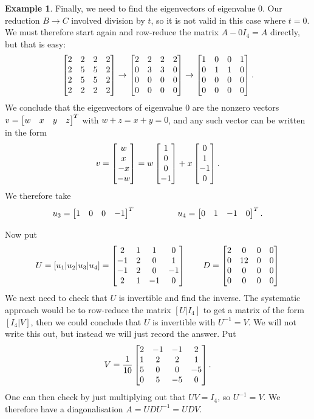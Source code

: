 \documentclass[reqno]{amsart}
\theoremstyle{definition}
\newtheorem{example}[theorem]{Example}
\begin{document}
\begin{example}
 Finally, we need to find the eigenvectors of eigenvalue $0$.  Our
 reduction $B\to C$ involved division by $t$, so it is not valid in
 this case where $t=0$.  We must therefore start again and row-reduce
 the matrix $A-0I_4=A$ directly, but that is easy:
 \[ \left[\begin{matrix} 2&2&2&2 \\ 2&5&5&2 \\ 2&5&5&2 \\ 2&2&2&2 \end{matrix}\right] \to 
    \left[\begin{matrix} 2&2&2&2 \\ 0&3&3&0 \\ 0&0&0&0 \\ 0&0&0&0 \end{matrix}\right] \to 
    \left[\begin{matrix} 1&0&0&1 \\ 0&1&1&0 \\ 0&0&0&0 \\ 0&0&0&0 \end{matrix}\right].  
 \]
 We conclude that the eigenvectors of eigenvalue $0$ are the nonzero vectors
 $v=\left[\begin{matrix} w&x&y&z\end{matrix}\right]^T$ with $w+z=x+y=0$, and any such vector can be
 written in the form
 \[ v = \left[\begin{matrix} w \\ x \\ -x \\ -w \end{matrix}\right] 
      = w \left[\begin{matrix} 1 \\ 0 \\ 0 \\ -1 \end{matrix}\right] + 
        x \left[\begin{matrix} 0 \\ 1 \\ -1 \\ 0 \end{matrix}\right].
 \]
 We therefore take 
 \[ u_3 = \left[\begin{matrix} 1&0&0&-1\end{matrix}\right]^T \hspace{5em}
    u_4 = \left[\begin{matrix} 0&1&-1&0\end{matrix}\right]^T .
 \]

 Now put 
 \[ U = [u_1|u_2|u_3|u_4] =
     \left[\begin{matrix} 
       2 & 1 &  1 &  0 \\
      -1 & 2 &  0 &  1 \\
      -1 & 2 &  0 & -1 \\
       2 & 1 & -1 &  0
     \end{matrix}\right]
     \qquad
     D = \left[\begin{matrix}
      2 & 0  & 0 & 0 \\
      0 & 12 & 0 & 0 \\
      0 & 0  & 0 & 0 \\
      0 & 0  & 0 & 0
     \end{matrix}\right]
 \]
 We next need to check that $U$ is invertible and find the inverse.
 The systematic approach would be to row-reduce the matrix $[U|I_4]$
 to get a matrix of the form $[I_4|V]$, then we could conclude that
 $U$ is invertible with $U^{-1}=V$.  We will not write this out, but
 instead we will just record the answer.  Put
 \[ V = \frac{1}{10} \left[\begin{matrix}
         2 & -1 & -1 &  2 \\
         1 &  2 &  2 &  1 \\
         5 &  0 &  0 & -5 \\
         0 &  5 & -5 &  0
        \end{matrix}\right].
 \] 
 One can then check by just multiplying out that $UV=I_4$, so
 $U^{-1}=V$.  We therefore have a diagonalisation $A=UDU^{-1}=UDV$.
\end{example}
\end{document}
